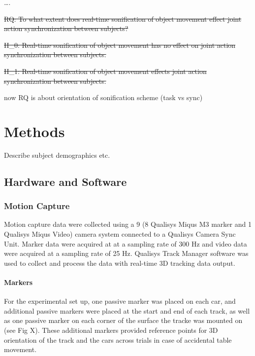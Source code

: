\documentclass[10pt,a4paper,onecolumn]{article}
\let\oldparagraph\paragraph
\renewcommand{\paragraph}[1]{\oldparagraph{#1}\mbox{}}
\begin{document}
\ldots.

\sout{RQ: To what extent does real-time sonification of object movement effect joint action synchronization between subjects?}

\sout{H\_0: Real-time sonification of object movement has no effect on joint action synchronization between subjects.}

\sout{H\_1: Real-time sonification of object movement effects joint action synchronization between subjects.}

now RQ is about orientation of sonification scheme (task vs sync)

\hypertarget{methods}{%
\section{Methods}\label{methods}}

Describe subject demographics etc.

\hypertarget{hardware-and-software}{%
\subsection{Hardware and Software}\label{hardware-and-software}}

\hypertarget{motion-capture}{%
\subsubsection{Motion Capture}\label{motion-capture}}

Motion capture data were collected using a 9 (8 Qualisys Miqus M3 marker and 1 Qualisys Miqus Video) camera system connected to a Qualisys Camera Sync Unit.
Marker data were acquired at at a sampling rate of 300 Hz and video data were acquired at a sampling rate of 25 Hz. Qualisys Track Manager software was used to collect and process the data with real-time 3D tracking data output.

\hypertarget{markers}{%
\paragraph{Markers}\label{markers}}

For the experimental set up, one passive marker was placed on each car, and additional passive markers were placed at the start and end of each track, as well as one passive marker on each corner of the surface the tracke was mounted on (see Fig X).
These additional markers provided reference points for 3D orientation of the track and the cars across trials in case of accidental table movement.
\end{document}
